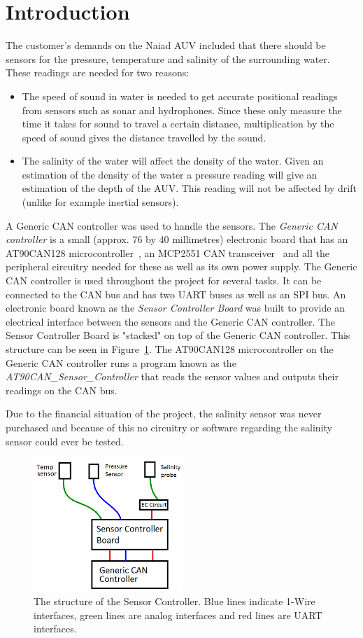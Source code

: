 
\section{Introduction}\label{sec:introduction}
The customer's demands on the Naiad AUV included that there should be sensors for the pressure, temperature and salinity of the surrounding water. These readings are needed for two reasons: 

\begin{itemize}
\item The speed of sound in water is needed to get accurate positional readings from sensors such as sonar and hydrophones. Since these only measure the time it takes for sound to travel a certain distance, multiplication by the speed of sound gives the distance travelled by the sound.

\item The salinity of the water will affect the density of the water. Given an estimation of the density of the water a pressure reading will give an estimation of the depth of the AUV. This reading will not be affected by drift (unlike for example inertial sensors).

\end{itemize}

A Generic CAN controller was used to handle the sensors. The \emph{Generic CAN controller} is a small (approx. 76 by 40 millimetres) electronic board that has an AT90CAN128 microcontroller~\cite{web:at90can}, an MCP2551 CAN transceiver~\cite{web:mcp2551} and all the peripheral circuitry needed for these as well as its own power supply. The Generic CAN controller is used throughout the project for several tasks. It can be connected to the CAN bus and has two UART buses as well as an SPI bus. \newline
An electronic board known as the \emph{Sensor Controller Board} was built to provide an electrical interface between the sensors and the Generic CAN controller. The Sensor Controller Board is "stacked" on top of the Generic CAN controller. This structure can be seen in Figure~\ref{fig:sensor_overview}.  \newline
The AT90CAN128 microcontroller on the Generic CAN controller runs a program known as the \newline
\emph{AT90CAN\_Sensor\_Controller} that reads the sensor values and outputs their readings on the CAN bus.

Due to the financial situation of the project, the salinity sensor was never purchased and because of this no circuitry or software regarding  the salinity sensor could ever be tested. 

\begin{figure}[h]
    \includegraphics[width=0.5\textwidth]{./figure/sensor_overview.png}
    \caption{The structure of the Sensor Controller. Blue lines indicate 1-Wire interfaces, green lines are analog interfaces and red lines are UART interfaces.}
    \label{fig:sensor_overview}
\end{figure}